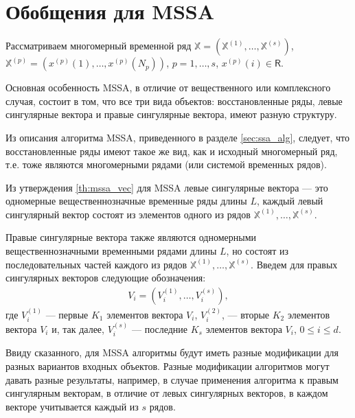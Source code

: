 \documentclass[specialist,
               substylefile = spbu.rtx,
               subf,href,colorlinks=true, 12pt]{disser}
\begin{document}
\section{Обобщения для MSSA}

Рассматриваем многомерный временной ряд $\mathbb{X}= \left(\mathbb{X}^{(1)}, \ldots,\mathbb{X}^{(s)}\right)$,\\ $\mathbb{X}^{(p)}= \left(x^{(p)}(1),\ldots,x^{(p)}(N_p)\right)$, $p=1,\ldots,s$, $x^{(p)}(i) \in \mathsf{R}$. 

Основная особенность MSSA, в отличие от вещественного или комплексного случая, состоит в том, что все три вида объектов: восстановленные ряды, левые сингулярные вектора и правые сингулярные вектора, имеют разную структуру.

Из описания алгоритма MSSA, приведенного в разделе \ref{sec:ssa_alg}, следует, что восстановленные ряды имеют такое же вид, как и исходный многомерный ряд, т.е. тоже являются многомерными рядами (или системой временных рядов). 

Из утверждения \ref{th:mssa_vec} для MSSA левые сингулярные вектора --- это одномерные вещественнозначные временные ряды
 длины $L$, каждый левый сингулярный вектор состоят из элементов одного из рядов $\mathbb{X}^{(1)}, \ldots, \mathbb{X}^{(s)}$. 
 
 Правые сингулярные вектора также являются одномерными вещественнозначными временными рядами длины $L$, но состоят из 
последовательных частей каждого из рядов $\mathbb{X}^{(1)}, \ldots, \mathbb{X}^{(s)}$.
Введем для правых сингулярных векторов следующие обозначения: 
\begin{gather} \label{eq:V_mssa}
{V}_{i} = \left({V}_i^{(1)}, \ldots, {V}_i^{(s)}\right), 
\end{gather}
где $V_i^{(1)}$ --- первые $K_1$ элементов вектора ${V}_{i}$,  $V_i^{(2)}$, --- вторые $K_2$ элементов вектора ${V}_{i}$ и, так далее, $V_i^{(s)}$ --- последние $K_s$ элементов вектора ${V}_{i}$, $0 \leqslant i \leqslant d$. 

Ввиду сказанного, для MSSA алгоритмы будут иметь разные модификации для разных вариантов входных объектов. Разные модификации алгоритмов могут давать разные результаты, например, в случае применения алгоритма к правым сингулярным векторам, в отличие от левых сингулярных векторов, в каждом векторе учитывается каждый из $s$ рядов.  
 
\end{document}
